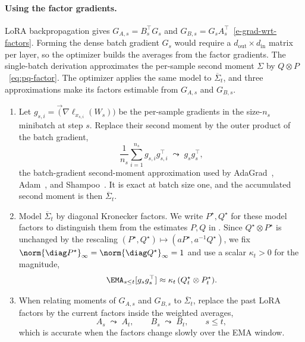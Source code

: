 \paragraph{Using the factor gradients.} LoRA backpropagation gives
$G_{A,s}=B_s^\top G_s$ and
$G_{B,s}=G_sA_s^\top$~\eqref{e-grad-wrt-factors}. Forming the dense batch
gradient $G_s$ would require a $d_{\mathrm{out}}\times d_{\mathrm{in}}$
matrix per layer, so the optimizer builds the averages from the factor
gradients. The single-batch derivation approximates the per-sample second
moment $\Sigma$ by $Q\otimes P$~\eqref{eq:pq-factor}. The optimizer applies
the same model to $\overline{\Sigma}_t$, and three approximations make its
factors estimable from $G_{A,s}$ and $G_{B,s}$.
\begin{enumerate}[leftmargin=1.6em,itemsep=2pt,topsep=2pt]
  \item Let
  $g_{s,i}=\vec(\nabla\ell_{x_{s,i}}(W_s))$ be the per-sample gradients in
  the size-$n_s$ minibatch at step $s$. Replace their second moment by the
  outer product of the batch gradient,
  \[
    \frac1{n_s}\sum_{i=1}^{n_s}g_{s,i}g_{s,i}^\top
    \;\leadsto\;
    g_sg_s^\top ,
  \]
  the batch-gradient second-moment approximation used by
  AdaGrad~\cite{adagrad}, Adam~\cite{adam}, and Shampoo~\cite{shampoo}.
  It is exact at batch size one, and the accumulated second moment is then
  $\overline{\Sigma}_t$.
  \item Model $\overline{\Sigma}_t$ by diagonal Kronecker factors. We write
  $P^\star,Q^\star$ for these model factors to distinguish them from the
  estimates $P,Q$ in . Since
  $Q^\star\otimes P^\star$ is unchanged by the
  rescaling $(P^\star,Q^\star)\mapsto(aP^\star,a^{-1}Q^\star)$, we fix
  $\norm{\diag P^\star}_\infty=\norm{\diag Q^\star}_\infty=1$ and use a
  scalar $\kappa_t>0$ for the magnitude,
  \begin{equation}\label{e-diag-kron-second-mom-model-t4}
    \EMA_{s \leq t}[g_sg_s^\top]\approx\kappa_t\,(Q^\star_t\otimes P^\star_t).
  \end{equation}
  \item When relating moments of $G_{A,s}$ and $G_{B,s}$ to $\overline{\Sigma}_t$, replace
  the past LoRA factors by the current factors inside the weighted averages,
  \[
    A_s\;\leadsto\;A_t,\qquad B_s\;\leadsto\;B_t,\qquad s\le t,
  \]
  which is accurate when the factors change slowly over the EMA window.
\end{enumerate}

